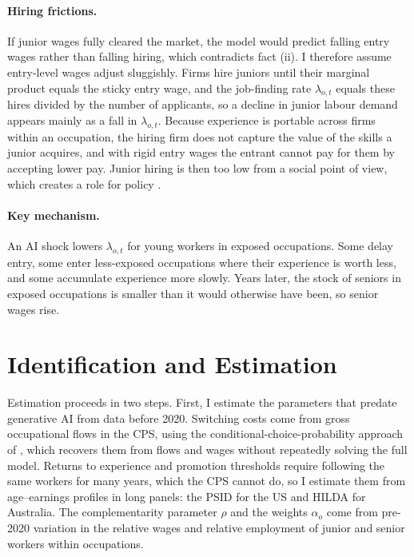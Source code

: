 \documentclass[11pt,a4paper]{article}
\begin{document}
\paragraph{Hiring frictions.} If junior wages fully cleared the market, the model would predict falling entry wages rather than falling hiring, which contradicts fact (ii). I therefore assume entry-level wages adjust sluggishly. Firms hire juniors until their marginal product equals the sticky entry wage, and the job-finding rate $\lambda_{o,t}$ equals these hires divided by the number of applicants, so a decline in junior labour demand appears mainly as a fall in $\lambda_{o,t}$. Because experience is portable across firms within an occupation, the hiring firm does not capture the value of the skills a junior acquires, and with rigid entry wages the entrant cannot pay for them by accepting lower pay. Junior hiring is then too low from a social point of view, which creates a role for policy \citep{ide2026}.

\paragraph{Key mechanism.} An AI shock lowers $\lambda_{o,t}$ for young workers in exposed occupations. Some delay entry, some enter less-exposed occupations where their experience is worth less, and some accumulate experience more slowly. Years later, the stock of seniors in exposed occupations is smaller than it would otherwise have been, so senior wages rise.

\section{Identification and Estimation}

Estimation proceeds in two steps. First, I estimate the parameters that predate generative AI from data before 2020. Switching costs come from gross occupational flows in the CPS, using the conditional-choice-probability approach of \citet{artuc2010}, which recovers them from flows and wages without repeatedly solving the full model. Returns to experience and promotion thresholds require following the same workers for many years, which the CPS cannot do, so I estimate them from age--earnings profiles in long panels: the PSID for the US and HILDA for Australia. The complementarity parameter $\rho$ and the weights $\alpha_o$ come from pre-2020 variation in the relative wages and relative employment of junior and senior workers within occupations.
\end{document}
